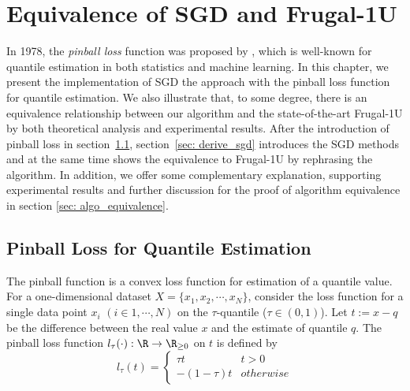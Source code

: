 \chapter{Equivalence of SGD and Frugal-1U}
\label{ch: algo_equal}

\graphicspath{{Figures/Frugal_SGD/}{./}} 

           
In 1978, the \textit{pinball loss} function was proposed by \citeauthor{koenkerRegressionQuantiles1978}\cite{koenkerRegressionQuantiles1978}, which is well-known for quantile estimation in both statistics and machine learning. In this chapter, we present the implementation of SGD the approach with the pinball loss function for quantile estimation. We also illustrate that, to some degree, there is an equivalence relationship between our algorithm and the state-of-the-art Frugal-1U\cite{maFrugalStreamingEstimating2014} by both theoretical analysis and experimental results. After the introduction of pinball loss in section~\ref{sec: pinball_loss}, section~\ref{sec: derive_sgd} introduces the SGD methods and at the same time shows the equivalence to Frugal-1U by rephrasing the algorithm. In addition, we offer some complementary explanation, supporting experimental results and further discussion for the proof of algorithm equivalence in section \ref{sec: algo_equivalence}.

\section{Pinball Loss for Quantile Estimation}
\label{sec: pinball_loss}
The pinball function is a convex loss function for estimation of a quantile value.
For a one-dimensional dataset $X = \{x_1, x_2, \cdots, x_N\}$, 
consider the loss function for a single data point $x_i$ $(i \in {1, \cdots, N})$ on the $\tau$-quantile ($\tau \in (0,1)$).
Let $t := x - q$ be the difference between the real value $x$ and the estimate of quantile $q$.
The pinball loss function $l_{\tau}(\cdot): \R \to \R_{\geq 0}$ on $t$ is defined by%
%
\begin{equation}
    l_\tau(t)= 
        \begin{cases}
            \tau t & t > 0\\
            -(1-\tau) t & otherwise
        \end{cases}
\end{equation}



